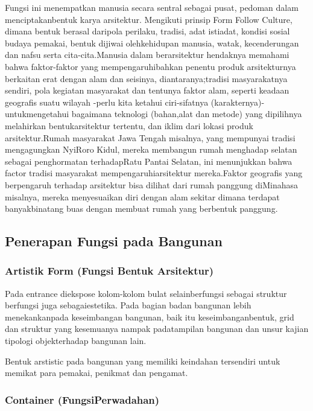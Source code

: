 \documentclass[../manperil.tex]{subfiles}
\begin{document}
Fungsi ini menempatkan manusia secara sentral sebagai pusat, pedoman dalam menciptakanbentuk karya arsitektur. Mengikuti prinsip Form Follow Culture, dimana bentuk berasal daripola perilaku, tradisi, adat istiadat, kondisi sosial budaya pemakai, bentuk dijiwai olehkehidupan manusia, watak, kecenderungan dan nafsu serta cita-cita.Manusia dalam berarsitektur hendaknya memahami bahwa faktor-faktor yang mempengaruhibahkan penentu produk arsitekturnya berkaitan erat dengan alam dan seisinya, diantaranya;tradisi masyarakatnya sendiri, pola kegiatan masyarakat dan tentunya faktor alam, seperti keadaan geografis suatu wilayah -perlu kita ketahui ciri-sifatnya (karakternya)- untukmengetahui bagaimana teknologi (bahan,alat dan metode) yang dipilihnya melahirkan bentukarsitektur tertentu, dan iklim dari lokasi produk arsitektur.Rumah masyarakat Jawa Tengah misalnya, yang mempunyai tradisi mengagungkan NyiRoro Kidul, mereka membangun rumah menghadap selatan sebagai penghormatan terhadapRatu Pantai Selatan, ini menunjukkan bahwa factor tradisi masyarakat mempengaruhiarsitektur mereka.Faktor geografis yang berpengaruh terhadap arsitektur bisa dilihat dari rumah panggung diMinahasa misalnya, mereka menyesuaikan diri dengan alam sekitar dimana terdapat banyakbinatang buas dengan membuat rumah yang berbentuk panggung.

\subsection{Penerapan Fungsi pada Bangunan}%
\label{sub:penerapan_fungsi_pada_bangunan}


\subsubsection{Artistik Form (Fungsi Bentuk Arsitektur)}%
\label{ssub:artistik_form_(fungsi_bentuk_arsitektur)}

Pada entrance diekspose kolom-kolom bulat selainberfungsi sebagai struktur berfungsi juga sebagaiestetika. Pada bagian badan bangunan lebih menekankanpada keseimbangan bangunan, baik itu keseimbanganbentuk, grid dan struktur yang kesemuanya nampak padatampilan bangunan dan unsur kajian tipologi objekterhadap bangunan lain.

Bentuk arstistic pada bangunan yang memiliki keindahan tersendiri untuk memikat para pemakai, penikmat dan pengamat.

\subsubsection{Container (FungsiPerwadahan)}%
\label{ssub:Container (FungsiPerwadahan)}
\end{document}
